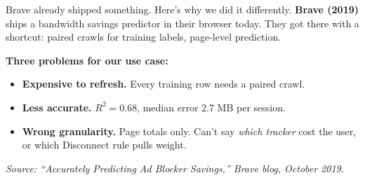 \documentclass[10pt,aspectratio=169]{beamer}
\begin{document}
\begin{frame}{Brave already shipped something. Here's why we did it differently.}
    \textbf{Brave (2019)} ships a bandwidth savings predictor in their browser today. They got there with a shortcut: paired crawls for training labels, page-level prediction.

    \vspace{0.4em}
    \begin{center}
    \end{center}

    \vspace{0.3em}
    \textbf{Three problems for our use case:}
    \begin{itemize}
        \item \textbf{Expensive to refresh.} Every training row needs a paired crawl.
        \item \textbf{Less accurate.} $R^2 = 0.68$, median error 2.7 MB per session.
        \item \textbf{Wrong granularity.} Page totals only. Can't say \textit{which tracker} cost the user, or which Disconnect rule pulls weight.
    \end{itemize}

    \vspace{0.4em}
    \tiny
    \textit{Source: ``Accurately Predicting Ad Blocker Savings,'' Brave blog, October 2019.}
\end{frame}
\end{document}
